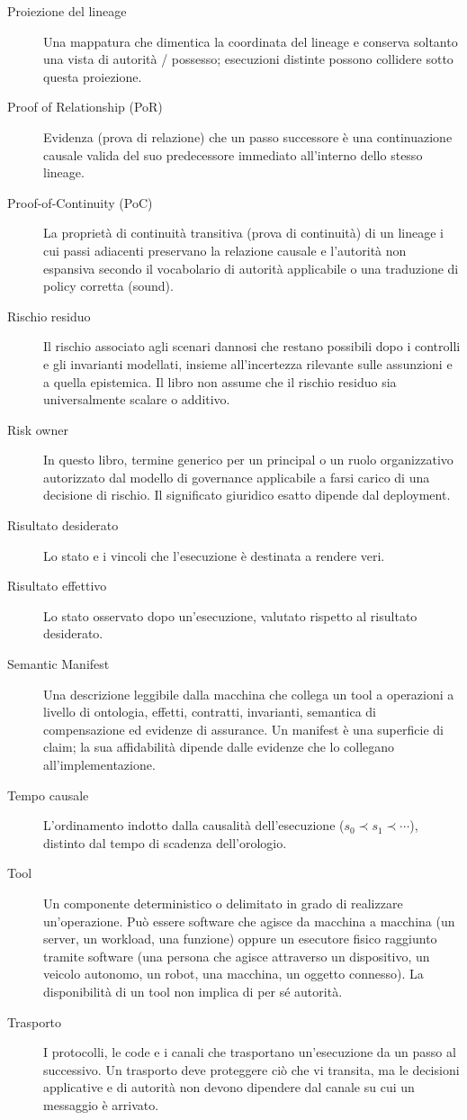 \documentclass[10pt,oneside,openany]{book}
\begin{document}
\begin{description}
\item[Proiezione del lineage] Una mappatura che dimentica la coordinata del lineage e conserva soltanto una vista di autorità / possesso; esecuzioni distinte possono collidere sotto questa proiezione.
\item[Proof of Relationship (PoR)] Evidenza (prova di relazione) che un passo successore è una continuazione causale valida del suo predecessore immediato all'interno dello stesso lineage.
\item[Proof-of-Continuity (PoC)] La proprietà di continuità transitiva (prova di continuità) di un lineage i cui passi adiacenti preservano la relazione causale e l'autorità non espansiva secondo il vocabolario di autorità applicabile o una traduzione di policy corretta (sound).
\item[Rischio residuo] Il rischio associato agli scenari dannosi che restano possibili dopo i controlli e gli invarianti modellati, insieme all'incertezza rilevante sulle assunzioni e a quella epistemica. Il libro non assume che il rischio residuo sia universalmente scalare o additivo.
\item[Risk owner] In questo libro, termine generico per un principal o un ruolo organizzativo autorizzato dal modello di governance applicabile a farsi carico di una decisione di rischio. Il significato giuridico esatto dipende dal deployment.
\item[Risultato desiderato] Lo stato e i vincoli che l'esecuzione è destinata a rendere veri.
\item[Risultato effettivo] Lo stato osservato dopo un'esecuzione, valutato rispetto al risultato desiderato.
\item[Semantic Manifest] Una descrizione leggibile dalla macchina che collega un tool a operazioni a livello di ontologia, effetti, contratti, invarianti, semantica di compensazione ed evidenze di assurance. Un manifest è una superficie di claim; la sua affidabilità dipende dalle evidenze che lo collegano all'implementazione.
\item[Tempo causale] L'ordinamento indotto dalla causalità dell'esecuzione ($s_0\prec s_1\prec\cdots$), distinto dal tempo di scadenza dell'orologio.
\item[Tool] Un componente deterministico o delimitato in grado di realizzare un'operazione. Può essere software che agisce da macchina a macchina (un server, un workload, una funzione) oppure un esecutore fisico raggiunto tramite software (una persona che agisce attraverso un dispositivo, un veicolo autonomo, un robot, una macchina, un oggetto connesso). La disponibilità di un tool non implica di per sé autorità.
\item[Trasporto] I protocolli, le code e i canali che trasportano un'esecuzione da un passo al successivo. Un trasporto deve proteggere ciò che vi transita, ma le decisioni applicative e di autorità non devono dipendere dal canale su cui un messaggio è arrivato.
\end{description}
\end{document}

